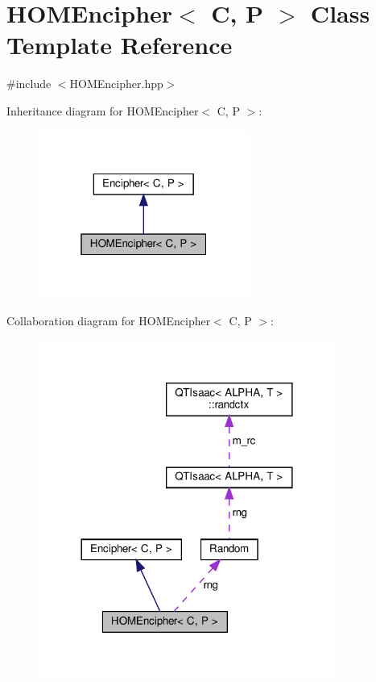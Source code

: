 \hypertarget{classHOMEncipher}{}\section{H\+O\+M\+Encipher$<$ C, P $>$ Class Template Reference}
\label{classHOMEncipher}


{\ttfamily \#include $<$H\+O\+M\+Encipher.\+hpp$>$}



Inheritance diagram for H\+O\+M\+Encipher$<$ C, P $>$\+:
\nopagebreak
\begin{figure}[H]
\begin{center}
\leavevmode
\includegraphics[width=196pt]{classHOMEncipher__inherit__graph}
\end{center}
\end{figure}


Collaboration diagram for H\+O\+M\+Encipher$<$ C, P $>$\+:
\nopagebreak
\begin{figure}[H]
\begin{center}
\leavevmode
\includegraphics[width=276pt]{classHOMEncipher__coll__graph}
\end{center}
\end{figure}
